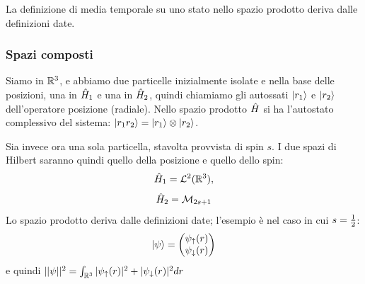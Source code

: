 La definizione di media temporale su uno stato nello spazio prodotto deriva dalle definizioni date.

\subsubsection*{Spazi composti}
Siamo in $\R^3$, e abbiamo due particelle inizialmente isolate e nella base delle posizioni, una in $\H_1$ e una in $\H_2$, quindi chiamiamo gli autossati $\Ket {r_1}$ e $\Ket {r_2}$ dell'operatore posizione (radiale). Nello spazio prodotto $\H$ si ha l'autostato complessivo del sistema: $\Ket {r_1r_2} = \Ket {r_1} \otimes \Ket {r_2}$.

Sia invece ora una sola particella, stavolta provvista di spin $s$. I due spazi di Hilbert saranno quindi quello della posizione e quello dello spin:
\[
	\H_1 = \L^2(\R^3), \]\[
	\H_2 = \M_{2s + 1}
\]
Lo spazio prodotto deriva dalle definizioni date; l'esempio è nel caso in cui $s = \half$:
\[
	\Ket \psi = \left( \begin{matrix}
		\psi_{\uparrow} (r) \\
		\psi_{\downarrow} (r) \\
	\end{matrix} \right)
\]
e quindi $\fabs \psi ^2 = \rnint[3] \sabs{\psi_\uparrow(r)} + \sabs{\psi_\downarrow(r)} dr$